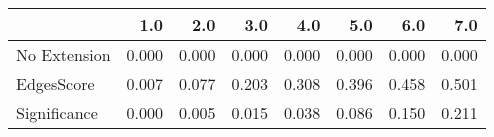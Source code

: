 \begin{tabular}{lrrrrrrr}
\toprule
{} &   1.0 &   2.0 &   3.0 &   4.0 &   5.0 &   6.0 &   7.0 \\
\midrule
No Extension & 0.000 & 0.000 & 0.000 & 0.000 & 0.000 & 0.000 & 0.000 \\
EdgesScore   & 0.007 & 0.077 & 0.203 & 0.308 & 0.396 & 0.458 & 0.501 \\
Significance & 0.000 & 0.005 & 0.015 & 0.038 & 0.086 & 0.150 & 0.211 \\
\bottomrule
\end{tabular}
